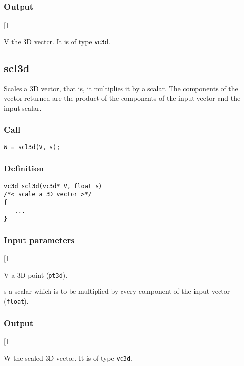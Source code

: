 \subsubsection*{Output}
\begin{desclist}{\tt }{\quad}[\tt ]
   \setlength\itemsep{0pt}
   \item[V] the 3D vector. It is of type \texttt{vc3d}.
\end{desclist}




\subsection{{scl3d}}
Scales a 3D vector, that is, it multiplies it by a scalar. The components of the vector returned are the product of the components of the input vector and the input scalar.

\subsubsection*{Call}
\begin{verbatim}W = scl3d(V, s);\end{verbatim}

\subsubsection*{Definition}
\begin{verbatim}
vc3d scl3d(vc3d* V, float s)
/*< scale a 3D vector >*/
{
   ...
}
\end{verbatim}

\subsubsection*{Input parameters}
\begin{desclist}{\tt }{\quad}[\tt ]
   \setlength\itemsep{0pt}
   \item[V] a 3D point (\texttt{pt3d}). 
   \item[s] a scalar which is to be multiplied by every component of the input vector (\texttt{float}).   
\end{desclist}

\subsubsection*{Output}
\begin{desclist}{\tt }{\quad}[\tt ]
   \setlength\itemsep{0pt}
   \item[W] the scaled 3D vector. It is of type \texttt{vc3d}.
\end{desclist}



